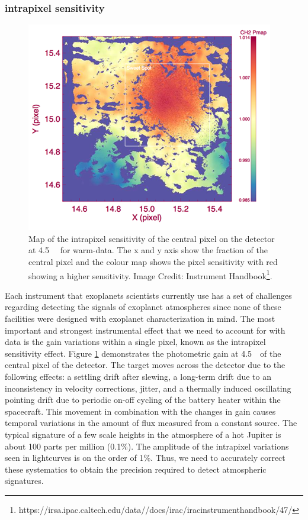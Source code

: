 \subsubsection{\spitzerIRAC intrapixel sensitivity}

\begin{figure}
    \centering
    \includegraphics[width = \linewidth]{IRAC_Instrument_Handbook183.png}
    \caption{Map of the intrapixel sensitivity of the central pixel on the detector at 4.5~\um~ for warm-\spitzerIRAC data. The x and y axis show the fraction of the central pixel and the colour map shows the pixel sensitivity with red showing a higher sensitivity. Image Credit: \spitzerIRAC Instrument Handbook\footnote{https://irsa.ipac.caltech.edu/data/\spitzer/docs/irac/iracinstrumenthandbook/47/}.  }
    \label{int:fig:pmap}
\end{figure}

Each instrument that exoplanets scientists currently use has a set of challenges regarding detecting the signals of exoplanet atmospheres since none of these facilities were designed with exoplanet characterization in mind. The most important and strongest instrumental effect that we need to account for with \spitzer data is the gain variations within a single pixel, known as the intrapixel sensitivity effect. Figure \ref{int:fig:pmap} demonstrates the photometric gain at 4.5~\um~of the central pixel of the \spitzerIRAC detector. The target moves across the detector due to the following effects: a settling drift after slewing, a long-term drift due to an inconsistency in velocity corrections, jitter, and a thermally induced oscillating pointing drift due to periodic on-off cycling of the battery heater within the spacecraft. This movement in combination with the changes in gain causes temporal variations in the amount of flux measured from a constant source. The typical signature of a few scale heights in the atmosphere of a hot Jupiter is about 100 parts per million (0.1\%). The amplitude of the intrapixel variations seen in \spitzer lightcurves is on the order of 1\%. Thus, we need to accurately correct these systematics to obtain the precision required to detect atmospheric signatures.

